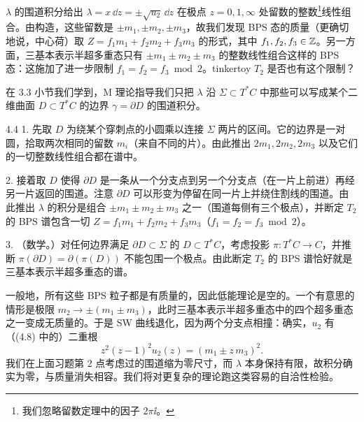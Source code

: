 
 $\lambda$ 的围道积分给出 $\lambda=x\,\dd z=\pm\sqrt{u_2}\,\dd z$ 在极点 $z=0,1,\infty$ 处留数的整数\footnote{我们忽略留数定理中的因子 $2\pi\ii$。}线性组合。由构造，这些留数是 $\pm m_1,\pm m_2,\pm m_3$，故我们发现 BPS 态的质量（更确切地说，中心荷）取 $Z=f_1m_1+f_2m_2+f_3m_3$ 的形式，其中 $f_1,f_2,f_3\in\mathbb{Z}$。另一方面，三基本表示半超多重态只有 $\pm m_1\pm m_2\pm m_3$ 的整数线性组合这样的 BPS 态：这施加了进一步限制 $f_1=f_2=f_3\bmod 2$。tinkertoy $T_2$ 是否也有这个限制？

在 3.3 小节我们学到，M 理论指导我们只把 $\lambda$ 沿 $\Sigma\subset T^*C$ 中那些可以写成某个二维曲面 $D\subset T^*C$ 的边界 $\gamma=\partial D$ 的围道积分。

\begin{exercise}{4.4}
1. 先取 $D$ 为绕某个穿刺点的小圆乘以连接 $\Sigma$ 两片的区间。它的边界是一对圆，拾取两次相同的留数 $m_i$（来自不同的片）。由此推出 $2m_1,2m_2,2m_3$ 以及它们的一切整数线性组合都在谱中。

2. 接着取 $D$ 使得 $\partial D$ 是一条从一个分支点到另一个分支点（在一片上前进）再经另一片返回的围道。注意 $\partial D$ 可以形变为停留在同一片上并绕住割线的围道。由此推出 $\lambda$ 的积分是组合 $\pm m_1\pm m_2\pm m_3$ 之一（围道每侧有三个极点），并断定 $T_2$ 的 BPS 谱包含一切 $Z=f_1m_1+f_2m_2+f_3m_3$（$f_1=f_2=f_3\bmod 2$）。

3. （数学。）对任何边界满足 $\partial D\subset\Sigma$ 的 $D\subset T^*C$，考虑投影 $\pi: T^*C\to C$，并推断 $\pi(\partial D)=\partial(\pi(D))$ 不能包围一个极点。由此断定 $T_2$ 的 BPS 谱恰好就是三基本表示半超多重态的谱。
\end{exercise}

一般地，所有这些 BPS 粒子都是有质量的，因此低能理论是空的。一个有意思的情形是极限 $m_2\to\pm(m_1\pm m_3)$，此时三基本表示半超多重态中的四个超多重态之一变成无质量的。于是 SW 曲线退化，因为两个分支点相撞：确实，$u_2$ 有（(4.8) 中的）二重根
\begin{equation}
  z^2(z-1)^2u_2(z)=(m_1\pm z\,m_3)^2.
  \tag{4.10}
\end{equation}
我们在上面习题第 2 点考虑过的围道缩为零尺寸，而 $\lambda$ 本身保持有限，故积分确实为零，与质量消失相容。我们将对更复杂的理论跑这类容易的自洽性检验。


